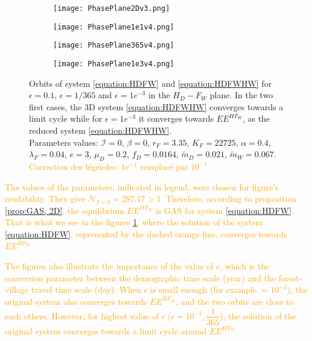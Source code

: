 \documentclass{article}
\newcommand{\lfw}{\lambda_{F}}
\newcommand{\lfw}{\lambda_{F}}
\newcommand{\cI}{\mathcal{I}}
\newcommand{\mW}{\tilde{m}_W}
\newcommand{\mD}{\tilde{m}_D}
\newcommand{\vdeux}[1]{\textcolor{orange}{#1}}
\theoremstyle{definition}
\theoremstyle{remark}
\begin{document}
\begin{figure}[!ht]
\centering
\begin{subfigure}{0.45\textwidth}
\centering
\texttt{[image: PhasePlane2Dv3.png]}
\caption{}
\end{subfigure}
\begin{subfigure}{0.45\textwidth}
\centering
\texttt{[image: PhasePlane1e1v4.png]}
\caption{}
\end{subfigure}
\begin{subfigure}{0.45\textwidth}
\centering
\texttt{[image: PhasePlane365v4.png]}
\caption{}
\end{subfigure}
\begin{subfigure}{0.45\textwidth}
\centering
\texttt{[image: PhasePlane1e3v4.png]}
\caption{}
\end{subfigure}
\caption{Orbits of system \eqref{equation:HDFW} and \eqref{equation:HDFWHW} for $\epsilon = 0.1$, $\epsilon = 1/365$ and $\epsilon = 1e^{-3}$ in the $H_D - F_W$ plane. In the two first cases, the 3D system \eqref{equation:HDFWHW} converges towards a limit cycle while for $\epsilon = 1e^{-3}$ it converges towards $EE^{HF_W}$, as the reduced system \eqref{equation:HDFWHW}. \\
Parameters values: $\cI = 0$, $\beta = 0$, $r_F = 3.35$, $K_F = 22725$, $\alpha = 0.4$, $\lfw = 0.04$, $e = 3$, $\mu_D = 0.2$, $f_D = 0.0164$, $\mD = 0.021$, $\mW = 0.067$. \\
\vdeux{Correction des légendes: $1e^{-1}$ remplacé par $10^{-1}$}}
\label{fig:comparison 2D-3D}
\end{figure}


\vdeux{
The values of the parameters, indicated in legend, were chosen for figure's readability. They give $\mathcal{N}_{I=0} = 287.17 > 1$. Therefore, according to proposition \ref{prop:GAS, 2D}, the equilibrium $EE^{HF_W}$ is GAS for system \eqref{equation:HDFW}. That is what we see in the figures \ref{fig:comparison 2D-3D}, where the solution of the system \eqref{equation:HDFW}, represented by the dashed orange line, converges towards $EE^{HF_W}$. }

\vdeux{
The figures also illustrate the importance of the value of $\epsilon$, which is the conversion parameter between the demographic time scale (year) and the forest-village travel time scale (day). When $\epsilon$ is small enough (for example $= 10^{-3}$), the original system also converges towards $EE^{HF_W}$, and the two orbits are close to each others.
However, for highest value of $\epsilon$ ($\epsilon = 10^{-1}, \dfrac{1}{365}$), the solution of the original system converges towards a limit cycle around $EE^{HF_W}$.
}
\end{document}
